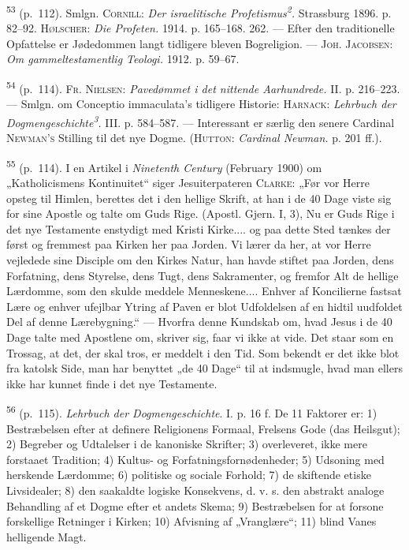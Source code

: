 \documentclass[12pt,a4paper,openany]{book}
\newcommand{\opage}[1]{\marginnote{\footnotesize\textit{[#1]}}}
\begin{document}
\begin{small}
\textsuperscript{53} (p.~112). Smlgn. \textsc{Cornill}: \textit{Der
israelitische
Profetismus\textsuperscript{2}.} Strassburg 1896. p. 82--92.
\textsc{Hølscher}: \textit{Die Profeten.} 1914. p. 165--168. 262. ---
Efter den traditionelle Opfattelse er Jødedommen langt tidligere bleven
Bogreligion. --- \textsc{Joh. Jacobsen}: \textit{Om gammeltestamentlig
Teologi.} 1912. p. 59--67.

\textsuperscript{54} (p.~114). \textsc{Fr. Nielsen}: \textit{Pavedømmet
i det nittende Aarhundrede.}
II. p. 216--223. --- Smlgn. om Conceptio immaculata’s tidligere
Historie: \textsc{Harnack}: \textit{Lehrbuch der
Dogmengeschichte\textsuperscript{3}.} III. p. 584--587. --- Interessant
er særlig den senere Cardinal \textsc{Newman’s} Stilling til det nye
Dogme. (\textsc{Hutton}: \textit{Cardinal Newman.} p. 201 ff.).

\textsuperscript{55} (p.~114). I en Artikel i \textit{Ninetenth Century}
(February 1900) om
„Katholicismens Kontinuitet“ siger Jesuiterpateren \textsc{Clarke}: „Før
vor Herre opsteg til Himlen, berettes det i den hellige Skrift, at han i
de 40 Dage viste sig for sine Apostle og talte om Guds Rige. (Apostl.
Gjern. I, 3), Nu er Guds Rige i det nye Testamente enstydigt med Kristi
Kirke.... og paa dette Sted tænkes der først og fremmest paa Kirken her
paa Jorden. Vi lærer da her, at vor Herre vejledede sine Disciple om den
Kirkes Natur, han havde stiftet paa Jorden, dens Forfatning, dens
Styrelse, dens Tugt, dens Sakramenter, og fremfor Alt de hellige
Lærdomme, som den skulde meddele Menneskene.... Enhver af Koncilierne
fastsat Lære og enhver ufejlbar Ytring af Paven er blot Udfoldelsen af
en hidtil
\opage{251}uudfoldet Del af denne Lærebygning.“ --- Hvorfra denne
Kundskab om, hvad Jesus i de 40 Dage talte med Apostlene om, skriver
sig, faar vi ikke at vide. Det staar som en Trossag, at det, der skal
tros, er meddelt i den Tid. Som bekendt er det ikke blot fra katolsk
Side, man har benyttet „de 40 Dage“ til at indsmugle, hvad man ellers
ikke har kunnet finde i det nye Testamente.

\textsuperscript{56} (p.~115). \textit{Lehrbuch der Dogmengeschichte}.
I. p. 16 f. De 11 Faktorer er:
1) Bestræbelsen efter at definere Religionens Formaal, Frelsens Gode
(das Heilsgut); 2) Begreber og Udtalelser i de kanoniske Skrifter; 3)
overleveret, ikke mere forstaaet Tradition; 4) Kultus- og
Forfatningsfornødenheder; 5) Udsoning med herskende Lærdomme; 6)
politiske og sociale Forhold; 7) de skiftende etiske Livsidealer; 8) den
saakaldte logiske Konsekvens, d. v. s. den abstrakt analoge Behandling
af et Dogme efter et andets Skema; 9) Bestræbelsen for at forsone
forskellige Retninger i Kirken; 10) Afvisning af „Vranglære“; 11) blind
Vanes helligende Magt.


\end{small}
\end{document}
